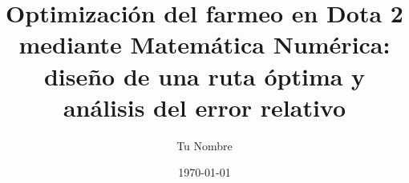 \documentclass[12pt,a4paper]{article}
\title{\textbf{Optimización del farmeo en Dota 2 mediante Matemática Numérica:\\ diseño de una ruta óptima y análisis del error relativo}}
\author{Tu Nombre}
\date{\today}
\begin{document}
\maketitle

\tableofcontents
\newpage










\nocite{*}


\end{document}
